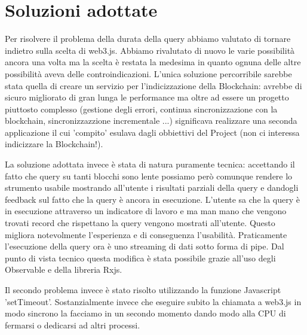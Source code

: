 \section{Soluzioni adottate}

Per risolvere il problema della durata della query abbiamo valutato di tornare indietro sulla scelta di web3.js.
Abbiamo rivalutato di nuovo le varie possibilità ancora una volta ma la scelta è restata la medesima in quanto ognuna delle altre possibilità aveva delle controindicazioni.
L'unica soluzione percorribile sarebbe stata quella di creare un servizio per l'indicizzazione della Blockchain:
avrebbe di sicuro migliorato di gran lunga le performance ma oltre ad essere un progetto piuttosto complesso (gestione degli errori, continua sincronizzazione con la blockchain, sincronizzazzione incrementale ...)
significava realizzare una seconda applicazione il cui 'compito' esulava dagli obbiettivi del Project (non ci interessa indicizzare la Blockchain!).

La soluzione adottata invece è stata di natura puramente tecnica:
accettando il fatto che query su tanti blocchi sono lente possiamo però comunque rendere lo strumento usabile mostrando all'utente i risultati parziali della query e dandogli feedback sul fatto che la query è ancora in esecuzione.
L'utente sa che la query è in esecuzione attraverso un indicatore di lavoro e ma man mano che vengono trovati record che rispettano la query vengono mostrati all'utente.
Questo migliora notevolmente l'esperienza e di conseguenza l'usabilità.
Praticamente l'esecuzione della query ora è uno streaming di dati sotto forma di pipe.
Dal punto di vista tecnico questa modifica è stata possibile grazie all'uso degli Observable e della libreria Rxjs.

\vspace{0.5cm}

Il secondo problema invece è stato risolto utilizzando la funzione Javascript 'setTimeout'.
Sostanzialmente invece che eseguire subito la chiamata a web3.js in modo sincrono la facciamo in un secondo momento dando modo alla CPU di fermarsi o dedicarsi ad altri processi.
